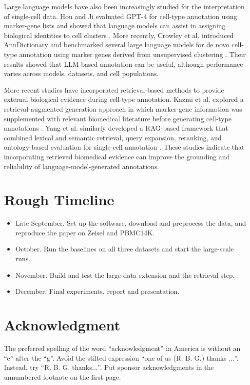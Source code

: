\documentclass[conference]{IEEEtran}
\begin{document}
Large language models have also been increasingly studied for the interpretation of single-cell data. Hou and Ji evaluated GPT-4 for cell-type annotation using marker-gene lists and showed that language models can assist in assigning biological identities to cell clusters \cite{hou2024gpt4}. More recently, Crowley et al. introduced AnnDictionary and benchmarked several large language models for de novo cell-type annotation using marker genes derived from unsupervised clustering \cite{crowley2025anndictionary}. Their results showed that LLM-based annotation can be useful, although performance varies across models, datasets, and cell populations.

More recent studies have incorporated retrieval-based methods to provide external biological evidence during cell-type annotation. Kazmi et al. explored a retrieval-augmented generation approach in which marker-gene information was supplemented with relevant biomedical literature before generating cell-type annotations \cite{kazmi2025beyond}. Yang et al. similarly developed a RAG-based framework that combined lexical and semantic retrieval, query expansion, reranking, and ontology-based evaluation for single-cell annotation \cite{yang2026rag}. These studies indicate that incorporating retrieved biomedical evidence can improve the grounding and reliability of language-model-generated annotations.

\section{Rough Timeline}
\begin{itemize}
\item{Late September.}
Set up the software, download and preprocess the data, and reproduce the paper on Zeisel and PBMC14K. 
\item{October.}
Run the baselines on all three datasets and start the large-scale runs.
\item{November.}
Build and test the large-data extension and the retrieval step.
\item{December.}
Final experiments, report and presentation. 
\end{itemize}

\section*{Acknowledgment}

The preferred spelling of the word ``acknowledgment'' in America is without 
an ``e'' after the ``g''. Avoid the stilted expression ``one of us (R. B. 
G.) thanks $\ldots$''. Instead, try ``R. B. G. thanks$\ldots$''. Put sponsor 
acknowledgments in the unnumbered footnote on the first page.



\vspace{12pt}
\end{document}

